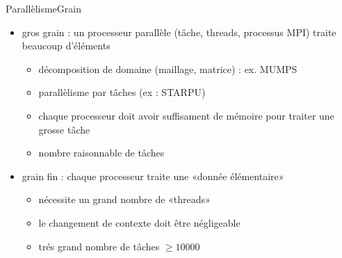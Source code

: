 \documentclass[11pt,mathserif]{beamer}
\newcommand{\hand}{\faHandORight}
\newcommand{\argi}{\faLightbulbO}
\begin{document}
\begin{frame}{Parallèlisme}{Grain}
\begin{itemize}[<+->]
  \item[\faTruck] gros grain : un processeur parallèle (tâche, threads, processus MPI) traite beaucoup d'éléments 
   \begin{itemize}
     \item décomposition de domaine (maillage, matrice) :  ex. MUMPS
     \item parallèlisme par tâches (ex : STARPU)
     \item[\hand] chaque processeur doit avoir suffisament de mémoire pour traiter une grosse tâche
     \item[\argi] nombre raisonnable de tâches
   \end{itemize}
 \item[\faBicycle] grain fin : chaque processeur traite une «donnée élémentaire»
   \begin{itemize}
     \item[\hand] nécessite un grand nombre de «threads»
     \item[\hand] le changement de contexte doit être négligeable
     \item[\argi] trés grand nombre de tâches $\geqslant 10000$
   \end{itemize}
\end{itemize}
\end{frame}
\end{document}
